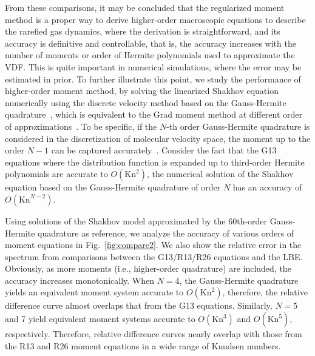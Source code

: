 From these comparisons, it may be concluded that the regularized moment method is a proper way to derive higher-order macroscopic equations to describe the rarefied gas dynamics, where the derivation is straightforward, and its accuracy is definitive and controllable, that is, the accuracy increases with the number of moments or order of Hermite polynomials used to approximate the VDF. This is quite important in numerical simulations, where the error may be estimated in prior. To further illustrate this point, we study the performance of higher-order moment method, by solving the linearized Shakhov equation numerically using the discrete velocity method based on the Gauss-Hermite quadrature~\cite{Shakhov_S}, which is equivalent to the Grad moment method at different order of approximations~\cite{Shan2006JFM}. To be specific, if the $N$-th order Gauss-Hermite quadrature is considered in the discretization of molecular velocity space, the moment up to the order $N-1$ can be captured accurately~\cite{Shan2006JFM}. Consider the fact that the G13 equations where the distribution function is expanded up to third-order Hermite polynomials are accurate to $O(\text{Kn}^2)$, the numerical solution of the Shakhov equation based on the Gauss-Hermite quadrature of order $N$ has an accuracy of $O(\text{Kn}^{N-2})$.













Using solutions of the Shakhov model approximated by the 60th-order Gauss-Hermite quadrature as reference, we analyze the accuracy of various orders of moment equations in Fig.~\ref{fig:compare2}. We also show the relative error in the spectrum from comparisons between the G13/R13/R26 equations and the LBE. Obviously, as more moments (i.e., higher-order quadrature) are included, the accuracy increases monotonically. When $N=4$, the Gauss-Hermite quadrature yields an equivalent moment system accurate to $O(\text{Kn}^2)$, therefore, the relative difference curve almost overlaps that from the G13 equations. Similarly, $N=5$ and 7 yield equivalent moment systems accurate to $O(\text{Kn}^3)$ and $O(\text{Kn}^5)$, respectively. Therefore, relative difference curves nearly overlap with those from the R13 and R26 moment equations in a wide range of Knudsen numbers.


